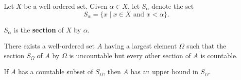 \begin{definition}
Let $X$ be a well-ordered set. Given $\alpha \in X$, let $S_\alpha$ denote the set
\[
    S_\alpha = \{ x \mid x \in X \text{ and } x < \alpha\}.
\]

$S_\alpha$ is the \textbf{section} of $X$ by $\alpha$.
\end{definition}

\begin{lemma}
There exists a well-ordered set $A$ having a largest element $\Omega$ such that the section
$S_\Omega$ of $A$ by $\Omega$ is uncountable but every other section of $A$ is countable.   
\end{lemma}

\begin{theorem}
If $A$ has a countable subset of $S_\Omega$, then $A$ has an upper bound in $S_\Omega$.     
\end{theorem}



